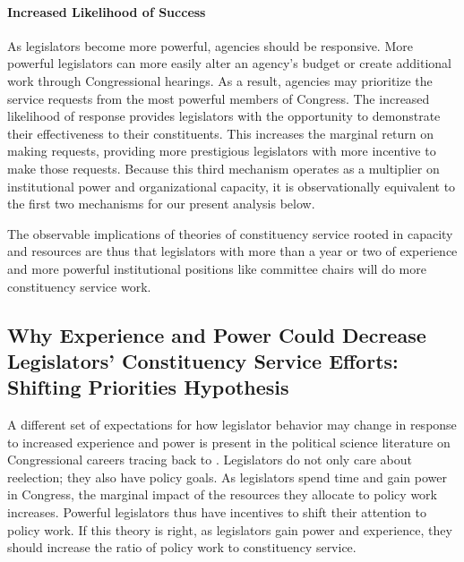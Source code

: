 \documentclass[12pt]{article}
\begin{document}

\paragraph{Increased Likelihood of Success} As legislators become more powerful, agencies should be responsive. More powerful legislators can more easily alter an agency's budget or create additional work through Congressional hearings. As a result, agencies may prioritize the service requests from the most powerful members of Congress. %
The increased likelihood of response provides legislators with the opportunity to demonstrate their effectiveness to their constituents. This increases the marginal return on making requests, providing more prestigious legislators with more incentive to make those requests.  %
Because this third mechanism operates as a multiplier on institutional power and organizational capacity, it is observationally equivalent to the first two mechanisms for our present analysis below.

The observable implications of theories of constituency service rooted in capacity and resources are thus that legislators with more than a year or two of experience and more powerful institutional positions like committee chairs will do more constituency service work.

\subsection{Why Experience and Power Could Decrease Legislators' Constituency Service Efforts: Shifting Priorities Hypothesis}

A different set of expectations for how legislator behavior may change in response to increased experience and power is present in the political science literature on Congressional careers tracing back to \citet{Fenno1973}. Legislators do not only care about reelection; they also have policy goals. As legislators spend time and gain power in Congress, the marginal impact of the resources they allocate to policy work increases. Powerful legislators thus have incentives to shift their attention to policy work. If this theory is right, as legislators gain power and experience, they should increase the ratio of policy work to constituency service.
\end{document}
